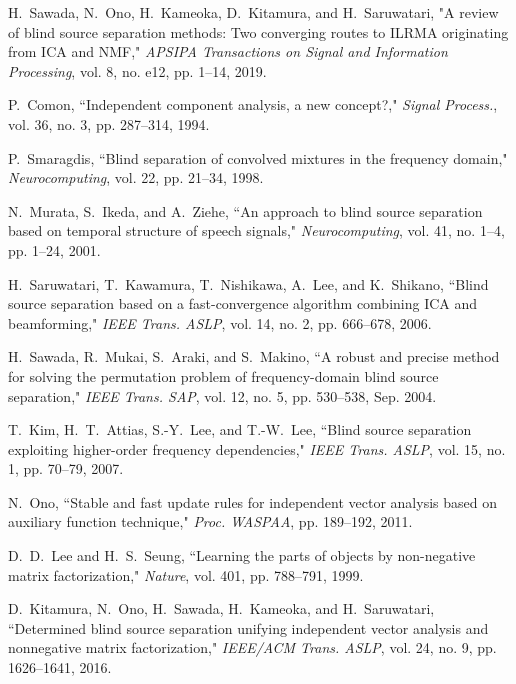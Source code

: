 \documentclass[honka]{nitkagawathesis}%
\begin{document}
\begin{thebibliography}{99}
  
  H.~Sawada, N.~Ono, H.~Kameoka, D.~Kitamura, and H.~Saruwatari, "A review of blind source separation methods: Two converging routes to ILRMA originating from ICA and NMF," {\em APSIPA Transactions on Signal and Information Processing}, vol. 8, no. e12, pp. 1–14, 2019.
  
  P.~Comon, ``Independent component analysis, a new concept?," {\em Signal Process.}, vol. 36, no. 3, pp. 287--314, 1994.
  
  P.~Smaragdis, ``Blind separation of convolved mixtures in the frequency domain," {\em Neurocomputing}, vol. 22, pp. 21--34, 1998.
  
  N.~Murata, S.~Ikeda, and A.~Ziehe, ``An approach to blind source separation based on temporal structure of speech signals,"  {\em Neurocomputing}, vol. 41, no. 1–4, pp. 1--24, 2001.
  
  H.~Saruwatari, T.~Kawamura, T.~Nishikawa, A.~Lee, and K.~Shikano, ``Blind source separation based on a fast-convergence algorithm combining ICA and beamforming,"  {\em IEEE Trans. ASLP}, vol. 14, no. 2, pp. 666--678, 2006.
  
  H.~Sawada, R.~Mukai, S.~Araki, and S.~Makino, ``A robust and precise method for solving the permutation problem of frequency-domain blind source separation,"  {\em IEEE Trans. SAP}, vol. 12, no. 5, pp. 530--538, Sep. 2004.
  
  T.~Kim, H.~T.~Attias, S.-Y.~Lee, and T.-W.~Lee, ``Blind source separation exploiting higher-order frequency dependencies," {\em  IEEE Trans. ASLP}, vol. 15, no. 1, pp. 70--79, 2007.
  
  N.~Ono, ``Stable and fast update rules for independent vector analysis based on auxiliary function technique," {\em  Proc. WASPAA}, pp. 189--192, 2011.
  
  D.~D.~Lee and H.~S.~Seung, ``Learning the parts of objects by non-negative matrix factorization," {\em Nature}, vol. 401, pp. 788--791, 1999.
  
  D.~Kitamura, N.~Ono, H.~Sawada, H.~Kameoka, and H.~Saruwatari, ``Determined blind source separation unifying independent vector analysis and nonnegative matrix factorization,"  {\em IEEE/ACM Trans. ASLP}, vol. 24, no. 9, pp. 1626--1641, 2016.
  

\end{thebibliography}
\end{document}
